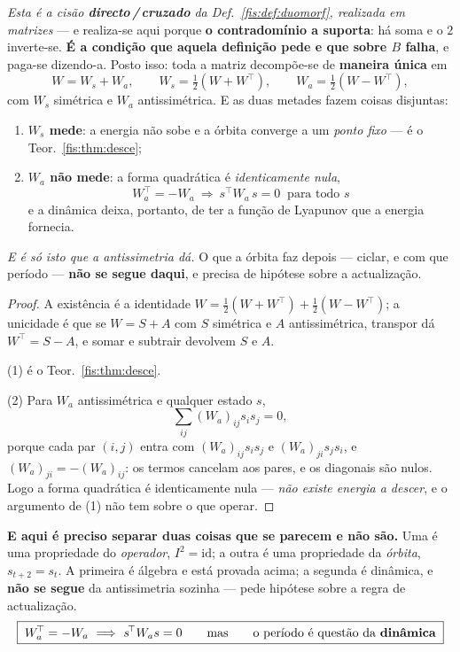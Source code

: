 \documentclass[livro.tex]{subfiles}
\begin{document}
\begin{teorema}\label{fis:thm:duastorres}
\emph{Esta é a cisão \textbf{directo\,/\,cruzado} da Def.~\ref{fis:def:duomorf},
realizada em matrizes} --- e realiza-se aqui porque \textbf{o contradomínio a
suporta}: há soma e o $2$ inverte-se. \textbf{É a condição que aquela definição
pede e que sobre $B$ falha}, e paga-se dizendo-a. Posto isso: toda a matriz
decompõe-se de \textbf{maneira única} em
\[
W=W_{s}+W_{a},\qquad
W_{s}=\tfrac12(W+W^{\!\top}),\qquad
W_{a}=\tfrac12(W-W^{\!\top}),
\]
com $W_s$ simétrica e $W_a$ antissimétrica. E as duas metades fazem coisas
disjuntas:
\begin{enumerate}\itemsep3pt
\item[(1)] \textbf{$W_s$ mede}: a energia não sobe e a órbita converge a um
\emph{ponto fixo} --- é o Teor.~\ref{fis:thm:desce};
\item[(2)] \textbf{$W_a$ não mede}: a forma quadrática é \emph{identicamente
nula},
\[
\boxed{\;W_a^{\!\top}=-W_a\ \Longrightarrow\ s^{\!\top}W_a\,s=0\ \text{ para todo } s\;}
\]
e a dinâmica deixa, portanto, de ter a função de Lyapunov que a energia fornecia.
\end{enumerate}
\emph{E é só isto que a antissimetria dá.} O que a órbita faz depois --- ciclar,
e com que período --- \textbf{não se segue daqui}, e precisa de hipótese sobre a
actualização.
\end{teorema}

\begin{proof}
A existência é a identidade $W=\tfrac12(W+W^{\!\top})+\tfrac12(W-W^{\!\top})$; a
unicidade é que se $W=S+A$ com $S$ simétrica e $A$ antissimétrica, transpor dá
$W^{\!\top}=S-A$, e somar e subtrair devolvem $S$ e $A$.

(1) é o Teor.~\ref{fis:thm:desce}.

(2) Para $W_a$ antissimétrica e qualquer estado $s$,
\[
\sum_{ij}(W_a)_{ij}s_is_j=0 ,
\]
porque cada par $(i,j)$ entra com $(W_a)_{ij}s_is_j$ e $(W_a)_{ji}s_js_i$, e
$(W_a)_{ji}=-(W_a)_{ij}$: os termos cancelam aos pares, e os diagonais são nulos.
Logo a forma quadrática é identicamente nula --- \emph{não existe energia a
descer}, e o argumento de (1) não tem sobre o que operar.
\end{proof}

\medskip\noindent\textbf{E aqui é preciso separar duas coisas que se parecem e
não são.} Uma é uma propriedade do \emph{operador}, $I^{2}=\mathrm{id}$; a outra
é uma propriedade da \emph{órbita}, $s_{t+2}=s_t$. A primeira é álgebra e está
provada acima; a segunda é dinâmica, e \textbf{não se segue} da antissimetria
sozinha --- pede hipótese sobre a regra de actualização.
\[
\boxed{\;W_a^{\!\top}=-W_a\ \Longrightarrow\ s^{\!\top}W_a s=0
\qquad\text{mas}\qquad
\text{o período é questão da \textbf{dinâmica}}\;}
\]
\end{document}
